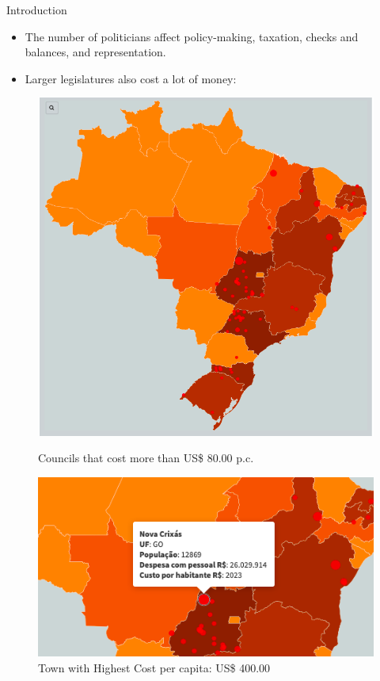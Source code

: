 \documentclass[11pt]{beamer}
\begin{document}
\begin{frame}{Introduction}
  \begin{itemize} \itemsep1em
   \item The number of politicians affect policy-making, taxation, checks and balances, and representation.
   \item Larger legislatures also cost a lot of money:
  \end{itemize}
  \begin{figure}[ht]
        \begin{minipage}[c]{0.45\linewidth}
            \centering
            \includegraphics[width=\textwidth]{alltowns.png}
            \caption{Councils that cost more than US\$ 80.00 p.c.}
            \label{fig:a}
        \end{minipage}
        \hspace{0.5cm}
        \begin{minipage}[c]{0.45\linewidth}
            \centering
            \includegraphics[width=\textwidth]{mostexpensive.png}
            \caption{Town with Highest Cost per capita: US\$ 400.00}
            \label{fig:b}
        \end{minipage}
    \end{figure}
\end{frame}
\end{document}
